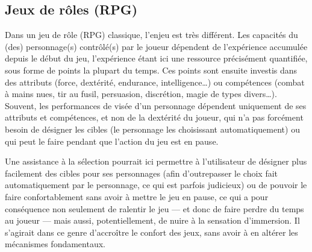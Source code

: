 	\subsection{Jeux de rôles (RPG)}
	Dans un jeu de rôle (RPG) classique, l'enjeu est très différent. Les capacités du (des) personnage(s) contrôlé(s) par le joueur dépendent de l'expérience accumulée depuis le début du jeu, l'expérience étant ici une ressource précisément quantifiée, sous forme de points la plupart du temps. Ces points sont ensuite investis dans des attributs (force, dextérité, endurance, intelligence\ldots{}) ou compétences (combat à mains nues, tir au fusil, persuasion, discrétion, magie de types divers\ldots{}). Souvent, les performances de visée d'un personnage dépendent uniquement de ses attributs et compétences, et non de la dextérité du joueur, qui n'a pas forcément besoin de désigner les cibles (le personnage les choisissant automatiquement) ou qui peut le faire pendant que l'action du jeu est en pause.
	
	Une assistance à la sélection pourrait ici permettre à l'utilisateur de désigner plus facilement des cibles pour ses personnages (afin d'outrepasser le choix fait automatiquement par le personnage, ce qui est parfois judicieux) ou de pouvoir le faire confortablement sans avoir à mettre le jeu en pause, ce qui a pour conséquence non seulement de ralentir le jeu --- et donc de faire perdre du temps au joueur --- mais aussi, potentiellement, de nuire à la sensation d'immersion. Il s'agirait dans ce genre d'accroître le confort des jeux, sans avoir à en altérer les mécanismes fondamentaux.
	
